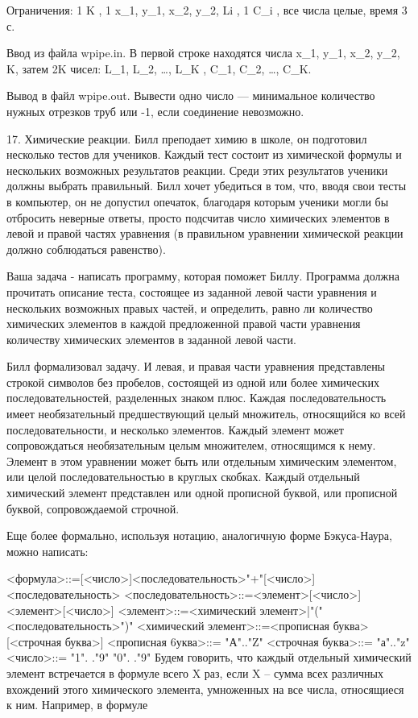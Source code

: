 \documentclass[]{article}
\begin{document}
Ограничения: 1 \leq K , 1 \leq x_1, y_1, x_2, y_2, Li , 1 \leq C_i , все числа целые, время 3 с.

Ввод из файла wpipe.in. В первой строке находятся числа x_1, y_1, x_2, y_2, K, затем 2K чисел: L_1, L_2, \ldots, L_K , C_1, C_2, \ldots, C_K.

Вывод в файл wpipe.out. Вывести одно число — минимальное количество нужных отрезков труб или -1, если соединение невозможно.



17. Химические реакции. Билл преподает химию в школе, он подготовил несколько тестов для учеников. Каждый тест состоит из химической формулы и нескольких возможных результатов реакции. Среди этих результатов ученики должны выбрать правильный. Билл хочет убедиться в том, что, вводя свои тесты в компьютер, он не допустил опечаток, благодаря которым ученики могли бы отбросить неверные ответы, просто подсчитав число химических элементов в левой и правой частях уравнения (в правильном уравнении химической реакции должно соблюдаться равенство).

Ваша задача - написать программу, которая поможет Биллу. Программа должна прочитать описание теста, состоящее из заданной левой части уравнения и нескольких возможных правых частей, и определить, равно ли количество химических элементов в каждой предложенной правой части уравнения количеству химических элементов в заданной левой части.

Билл формализовал задачу. И левая, и правая части уравнения представлены строкой символов без пробелов, состоящей из одной или более химических последовательностей, разделенных знаком плюс. Каждая последовательность имеет необязательный предшествующий целый множитель, относящийся ко всей последовательности, и несколько элементов. Каждый элемент может сопровождаться необязательным целым множителем, относящимся к нему. Элемент в этом уравнении может быть или отдельным химическим элементом, или целой последовательностью в круглых скобках. Каждый отдельный химический элемент представлен или одной прописной буквой, или прописной буквой, сопровождаемой строчной.

Еще более формально, используя нотацию, аналогичную форме Бэкуса-Наура, можно написать:

<формула>::=[<число>]<последовательность>{"+"[<число>]<последовательность>}
<последовательность>::=<элемент>[<число>]{<элемент>[<число>]} 
<элемент>::=<химический элемент>|"("<последовательность>")" 
<химический элемент>::=<прописная буква>[<строчная буква>] 
<прописная 6уква>::= "А".."Z" 
<строчная буква>::= "а".."z" 
<число>::= "1". ."9" {"0". ."9"}
Будем говорить, что каждый отдельный химический элемент встречается в формуле всего X раз, если X – сумма всех различных вхождений этого химического элемента, умноженных на все числа, относящиеся к ним. Например, в формуле
\end{document}
